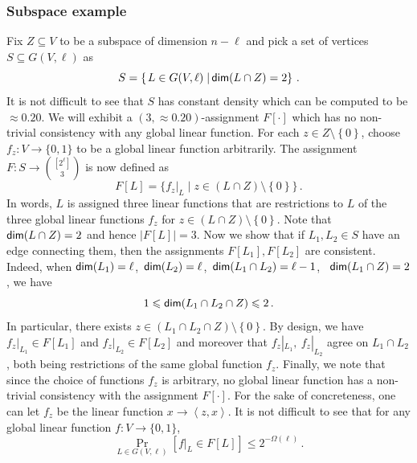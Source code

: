 \documentclass{toc}
\newcommand\sett[2]{\left\{ \left. #1 \;\right\vert #2 \right\}}
\newcommand\set[1]{{\left\{ #1 \right\}}}
\newcommand\Prob[2]{{\Pr_{#1}\left[ {#2} \right]}}
\newcommand*\dimm{{\sf dim}}
\begin{document}
\subsubsection{Subspace example}
Fix $Z\subseteq V$ to be a subspace of dimension $n-\ell$ and pick a set of vertices $S \subseteq G(V,\ell)$ as
\[
S=\sett{L\in G(V,\ell)}{\dimm(L\cap Z) =2}\,.%
\]
It is not difficult to see that $S$ has constant density which can be computed to be $\approx 0.20$.
We will exhibit a $(3, \approx 0.20)$-assignment $F[\cdot]$ which
has no non-trivial consistency with any global linear function.
For each $z \in Z \setminus \set{0}$, choose $f_z: V \to \{0,1\}$ to be a global linear function arbitrarily.
The assignment $F: S \to {[2^\ell] \choose 3}$ is now defined as
%
\[
F[L]=\{ f_z|_L \mid z \in (L\cap Z)\setminus\set{0}\}\,.%
\]
In words, $L$ is assigned three linear functions that are restrictions to $L$ of the three global linear
functions $f_z$ for $z \in  (L\cap Z)\setminus\set{0}$. Note that ${\sf dim}( L \cap Z) =2 $ and hence
$|F[L]|=3$. Now we show that
 if $L_1,L_2\in S$ have an edge connecting them, then the assignments $F[L_1], F[L_2]$ are consistent.
 Indeed, when ${\sf dim}(L_1)=\ell$,~${\sf dim}(L_2) = \ell$,~${\sf dim}(L_1 \cap L_2) = \ell-1$, ~${\sf dim}(L_1 \cap Z)=2$,  we have
 $$  1 \leqslant {\sf dim} (L_1 \cap L_2 \cap Z)  \leqslant 2\,.$$%
 In particular, there exists  $z \in (L_1 \cap L_2 \cap Z) \setminus \set{0}$. By design, we
  have $f_z|_{L_1} \in F[L_1]$
 and $f_z|_{L_2} \in F[L_2]$ and moreover that $f_z|_{L_1}, ~f_z|_{L_2}$ agree on  $L_1 \cap L_2$, both
 being restrictions of the same global function $f_z$. Finally, we note that since the choice of
 functions $f_z$ is arbitrary, no global linear function has a non-trivial consistency with the assignment $F[\cdot]$.
 For the sake of concreteness, one can let $f_z$ be the linear
 function $x \to \left< z, x\right>$. It is not
 difficult to see that for any global linear function $f: V \to \{0,1\}$,
   $$
  \Prob{L \in G(V, \ell)}{f|_L \in F[L] } \leqslant 2^{-\Omega(\ell)}\,.%
   $$
\end{document}
